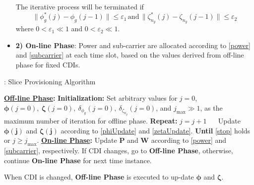 \documentclass[journal,draftclsnofoot,12pt,onecolumn]{IEEEtran}
\begin{document}
\begin{itemize}
The iterative process will be terminated if
\begin{equation}\label{stop}
\|\phi_g^*(j) - \phi_g(j-1)\| \leq \varepsilon_1 \,  \text{and} \,  \| \zeta_{n_g}^*(j) - \zeta_{n_g}(j-1)\| \leq \varepsilon_2
\end{equation}
where $0<\varepsilon_1\ll 1$ and $0<\varepsilon_2 \ll 1$.
\item[] \textbf{2) On-line Phase}: Power and sub-carrier are allocated according to \eqref{power} and \eqref{subcarrier} at each time slot, based on the values derived from off-line phase for fixed CDIs.
\end{itemize}
\begin{algorithm}
    \caption{: Slice Provisioning Algorithm}\label{Effective Capacity Algorithm}
    \begin{algorithmic}[]
        \STATE \hspace{-1em}\textbf{\underline{Off-line Phase}:}
        \STATE \textbf{Initialization:} Set arbitrary values for $j=0$, $\boldsymbol{\phi}(j=0),~\boldsymbol{\zeta}(j=0),~\delta_{\phi_g}(j=0),~\delta_{\zeta_{n_g}}(j=0)$, and $j_\text{max}\gg 1$,  as the maximum number of iteration for offline phase.
        \STATE \textbf{Repeat:} $j = j + 1$
        \STATE ~~ Update $\boldsymbol{\phi(j)}$ and $\boldsymbol{\zeta(j)}$ according to \eqref{phiUpdate} and \eqref{zetaUpdate}.
        \STATE \textbf{Until} \eqref{stop} holds or $j \geq j_\text{max}$.
        \STATE \hspace{-1em}\textbf{\underline{On-line Phase}:}
        \STATE Update $\textbf{P}$ and $\textbf{W}$ according to \eqref{power} and \eqref{subcarrier}, respectively.
        \STATE If CDI changes, go to \textbf{Off-line Phase}, otherwise, continue  \textbf{On-line Phase} for next time instance.
    \end{algorithmic}
\end{algorithm}
When CDI is changed, \textbf{Off-line Phase} is executed to up-date $\boldsymbol{\phi}$ and $\boldsymbol{\zeta}$\cite{4217781,4472014}.
\end{document}
